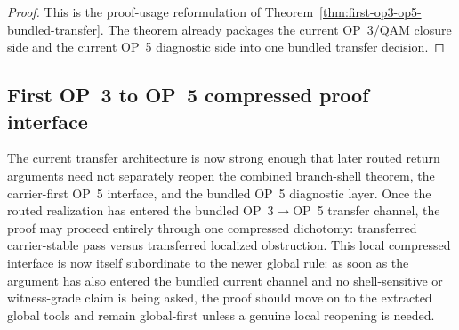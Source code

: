 \begin{proof}
This is the proof-usage reformulation of Theorem~\ref{thm:first-op3-op5-bundled-transfer}. The theorem already packages the current OP~3/QAM closure side and the current OP~5 diagnostic side into one bundled transfer decision.
\end{proof}


\subsection{First OP~3 to OP~5 compressed proof interface}
\label{sec:first-op3-op5-compressed-proof-interface}

\begin{remark}
The current transfer architecture is now strong enough that later routed return arguments need not separately reopen the combined branch-shell theorem, the carrier-first OP~5 interface, and the bundled OP~5 diagnostic layer. Once the routed realization has entered the bundled OP~3$\to$OP~5 transfer channel, the proof may proceed entirely through one compressed dichotomy: transferred carrier-stable pass versus transferred localized obstruction. This local compressed interface is now itself subordinate to the newer global rule: as soon as the argument has also entered the bundled current channel and no shell-sensitive or witness-grade claim is being asked, the proof should move on to the extracted global tools and remain global-first unless a genuine local reopening is needed.
\end{remark}

